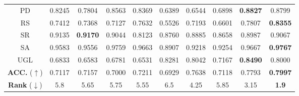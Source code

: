 \begin{table}[htbp]
{\begin{tabular}{cccccccccc}
PD & 0.8245  & 0.7804  & 0.8563  & 0.8369  & 0.6389  & 0.6544  & 0.6898  & \textbf{0.8827}  & 0.8799  \\ 
RS & 0.7412  & 0.7368  & 0.7127  & 0.7632  & 0.5526  & 0.7193  & 0.6601  & 0.7807  & \textbf{0.8355}  \\ 
SR & 0.9135  & \textbf{0.9170}  & 0.9044  & 0.8123  & 0.8760  & 0.8885  & 0.8658  & 0.8987  & 0.9067  \\ 
SA & 0.9583  & 0.9556  & 0.9759  & 0.9663  & 0.8907  & 0.9218  & 0.9254  & 0.9667  & \textbf{0.9767}  \\ 
UGL & 0.6833  & 0.6583  & 0.6781  & 0.6531  & 0.8281  & 0.8042  & 0.7167  & \textbf{0.8490}  & 0.8000  \\ 
\midrule
\textbf{ACC.} ($\uparrow$) & 0.7117  & 0.7157  & 0.7000  & 0.7211  & 0.6929  & 0.7638  & 0.7118  & 0.7793  & \textbf{0.7997} \\ 
\textbf{Rank}  ($\downarrow$) & 5.8 & 5.65 & 5.75 & 5.55 & 6.5 & 4.25 & 5.85 & 3.15 & \textbf{1.9} \\ 
\bottomrule
\end{tabular}}
\label{tab:uea50}
\end{table}

